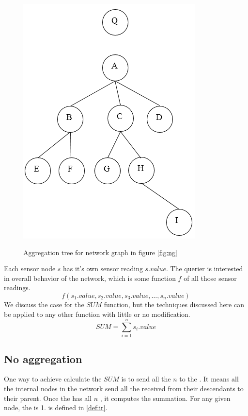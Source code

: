 	\begin{figure}[hp]
		\centering
		\includegraphics[scale = 0.6]{images/aggregation-tree.png}\\
		\caption{Aggregation tree for network graph in figure \ref{fig:ng}}
		\label{fig:at}
	\end{figure}

	Each sensor node $s$ has it's own sensor reading $s.value$. The querier is interested in overall behavior of the network, which is some function $f$ of all those sensor readings.
	\begin{equation}
		f(s_{1}.value, s_{2}.value, s_{3}.value, \dotsc, s_{n}.value)
	\end{equation}
	We discuss the case for the $SUM$ function, but the techniques discussed here can be applied to any other function with little or no modification. 
	\begin{equation}
		SUM = \sum\limits_{i=1}^n s_{i}.value
	\end{equation}

	\subsection{No aggregation}
		One way to achieve calculate the $SUM$ is to send all the $n$ \payloads to the \q.
		It means all the internal nodes in the network send all the \payloads received from their descendants to their parent.
		Once the \q has all $n$ \payloads, it computes the summation.
		For any given node, the \inforate is 1. \inforate is defined in \ref{def:ir}. 	
			
